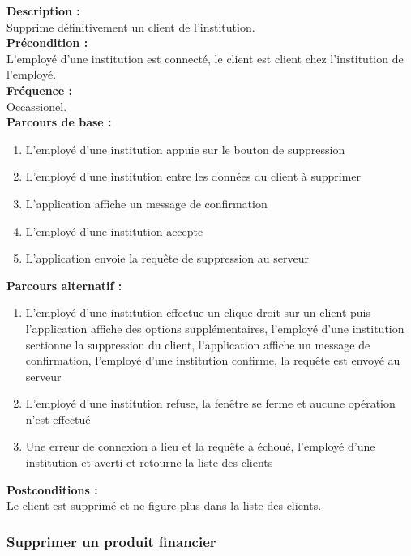 \documentclass[../rapport.tex]{subfiles}
\begin{document}
\textbf{Description :} \\
Supprime définitivement un client de l'institution. \\

\textbf{Précondition :} \\
L’employé d’une institution est connecté, le client est client chez l’institution de l’employé. \\

\textbf{Fréquence :} \\
Occassionel. \\

\textbf{Parcours de base :} \\
\begin{enumerate}
    \item L’employé d’une institution  appuie sur le bouton de suppression
    \item L’employé d’une institution  entre les données du client à supprimer
    \item L’application affiche un message de confirmation 
    \item L’employé d’une institution accepte
    \item L’application envoie la requête de suppression au serveur
\end{enumerate}
\bigskip

\textbf{Parcours alternatif :}
\begin{enumerate}
    \item L’employé d’une institution effectue un clique droit sur un client puis l’application affiche des options supplémentaires, l’employé d’une institution sectionne la suppression du client, l’application affiche un message de confirmation, l’employé d’une institution confirme, la requête est envoyé au serveur
    \item L’employé d’une institution refuse, la fenêtre se ferme et aucune opération n’est effectué
    \item Une erreur de connexion a lieu et la requête a échoué, l’employé d’une institution et averti et retourne la liste des clients
\end{enumerate}

\textbf{Postconditions :} \\
Le client est supprimé et ne figure plus dans la liste des clients. \\



\subsubsection{Supprimer un produit financier}
\end{document}
